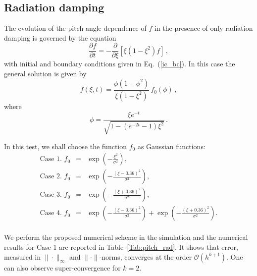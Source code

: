 \documentclass[preprint,11pt]{elsarticle}
\newcommand{\bq}{\begin{equation}}
\newcommand{\eq}{\end{equation}}
\begin{document}
\subsection{Radiation damping}\label{SubSect:Pitch-3}
The evolution of the pitch angle dependence of $f$ in the presence of only radiation damping is governed by the equation
\bq
\label{pitch_Rad_eq}
\frac{\partial f}{\partial t}= -\frac{\partial}{\partial\xi} \left[\xi \left(1-\xi^2\right) f\right] \, ,
\eq
with initial and boundary conditions given in Eq.~(\ref{ic_bc}).
In this case the general solution is given by 
\bq
\label{pitch_Rad_sol}
f(\xi,t)=\frac{\phi \left ( 1- \phi^2\right)}{\xi \left(1-\xi^2\right)}\, f_0(\phi) \, ,
\eq
where
\bq
\phi=\frac{\xi e^{-t}}{\sqrt{1-\left(e^{-2t}-1\right) \xi^2}}\, .
\eq

 In this test, we shall choose the function $f_0$ as Gaussian functions:
\begin{eqnarray*}
\text{Case 1.   }f_0 &=& \exp(-\frac{\xi^2}{\sigma^2}),\\
\text{Case 2.   }f_0 &=& \exp(-\frac{(\xi-0.36)^2}{\sigma^2}),\\
\text{Case 3.   }f_0 &=& \exp(-\frac{(\xi+0.36)^2}{\sigma^2}),\\
\text{Case 4.   }f_0 &=& \exp(-\frac{(\xi-0.36)^2}{\sigma^2})+\exp(-\frac{(\xi+0.36)^2}{\sigma^2}).\\
\end{eqnarray*}

We perform the proposed numerical scheme in the simulation and the numerical results for Case 1 are reported in Table~\ref{Tab:pitch_rad}. It shows that error, measured in $\|\cdot\|_{\infty}$ and $\|\cdot\|$-norms, converges at the order $\mathcal{O}(h^{k+1})$. One can also observe super-convergence for $k=2$.
\end{document}
